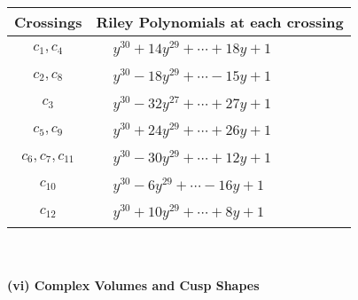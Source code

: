 \documentclass[1p]{elsarticle_modified}
\theoremstyle{definition}
\begin{document}
\begin{tabular}{m{50pt}|m{274pt}}
Crossings & \hspace{64pt}Riley Polynomials at each crossing \\
\hline $$\begin{aligned}c_{1},c_{4}\end{aligned}$$&$\begin{aligned}
&y^{30}+14 y^{29}+\cdots+18 y+1
\end{aligned}$\\
\hline $$\begin{aligned}c_{2},c_{8}\end{aligned}$$&$\begin{aligned}
&y^{30}-18 y^{29}+\cdots-15 y+1
\end{aligned}$\\
\hline $$\begin{aligned}c_{3}\end{aligned}$$&$\begin{aligned}
&y^{30}-32 y^{27}+\cdots+27 y+1
\end{aligned}$\\
\hline $$\begin{aligned}c_{5},c_{9}\end{aligned}$$&$\begin{aligned}
&y^{30}+24 y^{29}+\cdots+26 y+1
\end{aligned}$\\
\hline $$\begin{aligned}c_{6},c_{7},c_{11}\end{aligned}$$&$\begin{aligned}
&y^{30}-30 y^{29}+\cdots+12 y+1
\end{aligned}$\\
\hline $$\begin{aligned}c_{10}\end{aligned}$$&$\begin{aligned}
&y^{30}-6 y^{29}+\cdots-16 y+1
\end{aligned}$\\
\hline $$\begin{aligned}c_{12}\end{aligned}$$&$\begin{aligned}
&y^{30}+10 y^{29}+\cdots+8 y+1
\end{aligned}$\\
\hline
\end{tabular}\\~\\
\newpage\flushleft \textbf{(vi) Complex Volumes and Cusp Shapes}
\end{document}

